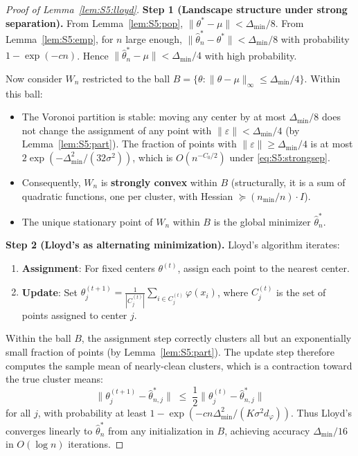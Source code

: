 \documentclass[twoside]{article}
\theoremstyle{plain}
\theoremstyle{definition}
\theoremstyle{remark}
\newcommand{\1}{\mathbf{1}}
\renewcommand{\phi}{\varphi}
\newcommand{\htheta}{\hat{\theta}}
\newcommand{\norm}[1]{\lVert#1\rVert}
\begin{document}
\begin{proof}[Proof of Lemma~\ref{lem:S5:lloyd}]

\noindent\textbf{Step 1 (Landscape structure under strong separation).}
From Lemma~\ref{lem:S5:pop}, $\norm{\theta^*-\mu}<\Delta_{\min}/8$.
From Lemma~\ref{lem:S5:emp}, for $n$ large enough,
$\norm{\htheta_n^*-\theta^*}<\Delta_{\min}/8$ with probability
$1-\exp(-c n)$.  Hence $\norm{\htheta_n^*-\mu}<\Delta_{\min}/4$ with
high probability.

Now consider $W_n$ restricted to the ball
$B=\{\theta:\norm{\theta-\mu}_\infty\le\Delta_{\min}/4\}$.  Within this
ball:
\begin{itemize}
\item The Voronoi partition is stable: moving any center by at most
$\Delta_{\min}/8$ does not change the assignment of any point with
$\norm{\varepsilon}<\Delta_{\min}/4$ (by Lemma~\ref{lem:S5:part}).
The fraction of points with $\norm{\varepsilon}\ge\Delta_{\min}/4$ is
at most $2\exp(-\Delta_{\min}^2/(32\sigma^2))$, which is
$O(n^{-C_0/2})$ under \eqref{eq:S5:strongsep}.
\item Consequently, $W_n$ is \textbf{strongly convex} within $B$
(structurally, it is a sum of quadratic functions, one per cluster,
with Hessian $\succeq (n_{\min}/n)\cdot I$).
\item The unique stationary point of $W_n$ within $B$ is the global
minimizer $\htheta_n^*$.
\end{itemize}

\noindent\textbf{Step 2 (Lloyd's as alternating minimization).}
Lloyd's algorithm iterates:
\begin{enumerate}
\item \textbf{Assignment}: For fixed centers $\theta^{(t)}$, assign each
point to the nearest center.
\item \textbf{Update}: Set
$\theta_j^{(t+1)}=\frac1{|C_j^{(t)}|}\sum_{i\in C_j^{(t)}}\phi(x_i)$,
where $C_j^{(t)}$ is the set of points assigned to center $j$.
\end{enumerate}
Within the ball $B$, the assignment step correctly clusters all but an
exponentially small fraction of points (by Lemma~\ref{lem:S5:part}).
The update step therefore computes the sample mean of nearly-clean
clusters, which is a contraction toward the true cluster means:
\[
\norm{\theta_j^{(t+1)}-\htheta_{n,j}^*}
\;\le\; \frac12\norm{\theta_j^{(t)}-\htheta_{n,j}^*}
\]
for all $j$, with probability at least
$1-\exp(-c n\Delta_{\min}^2/(K\sigma^2 d_\phi))$.  Thus Lloyd's converges
linearly to $\htheta_n^*$ from any initialization in $B$, achieving
accuracy $\Delta_{\min}/16$ in $O(\log n)$ iterations.


\end{proof}
\end{document}
